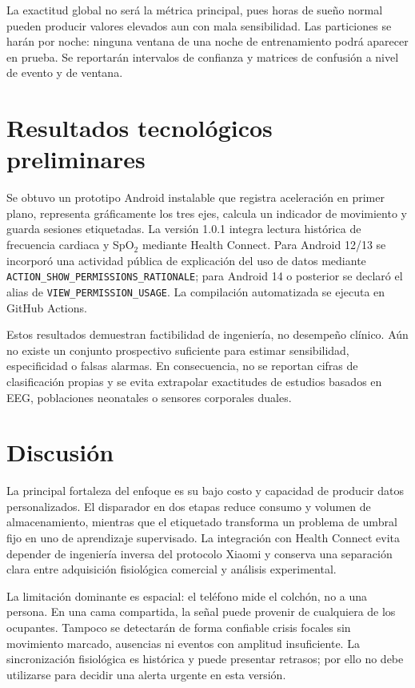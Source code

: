 \documentclass[12pt]{article}
\begin{document}
La exactitud global no será la métrica principal, pues horas de sueño normal pueden producir valores elevados aun con mala sensibilidad. Las particiones se harán por noche: ninguna ventana de una noche de entrenamiento podrá aparecer en prueba. Se reportarán intervalos de confianza y matrices de confusión a nivel de evento y de ventana.

\section{Resultados tecnológicos preliminares}

Se obtuvo un prototipo Android instalable que registra aceleración en primer plano, representa gráficamente los tres ejes, calcula un indicador de movimiento y guarda sesiones etiquetadas. La versión 1.0.1 integra lectura histórica de frecuencia cardiaca y SpO$_2$ mediante Health Connect. Para Android 12/13 se incorporó una actividad pública de explicación del uso de datos mediante \texttt{ACTION\_SHOW\_PERMISSIONS\_RATIONALE}; para Android 14 o posterior se declaró el alias de \texttt{VIEW\_PERMISSION\_USAGE}. La compilación automatizada se ejecuta en GitHub Actions.

Estos resultados demuestran factibilidad de ingeniería, no desempeño clínico. Aún no existe un conjunto prospectivo suficiente para estimar sensibilidad, especificidad o falsas alarmas. En consecuencia, no se reportan cifras de clasificación propias y se evita extrapolar exactitudes de estudios basados en EEG, poblaciones neonatales o sensores corporales duales.

\section{Discusión}

La principal fortaleza del enfoque es su bajo costo y capacidad de producir datos personalizados. El disparador en dos etapas reduce consumo y volumen de almacenamiento, mientras que el etiquetado transforma un problema de umbral fijo en uno de aprendizaje supervisado. La integración con Health Connect evita depender de ingeniería inversa del protocolo Xiaomi y conserva una separación clara entre adquisición fisiológica comercial y análisis experimental.

La limitación dominante es espacial: el teléfono mide el colchón, no a una persona. En una cama compartida, la señal puede provenir de cualquiera de los ocupantes. Tampoco se detectarán de forma confiable crisis focales sin movimiento marcado, ausencias ni eventos con amplitud insuficiente. La sincronización fisiológica es histórica y puede presentar retrasos; por ello no debe utilizarse para decidir una alerta urgente en esta versión.
\end{document}
